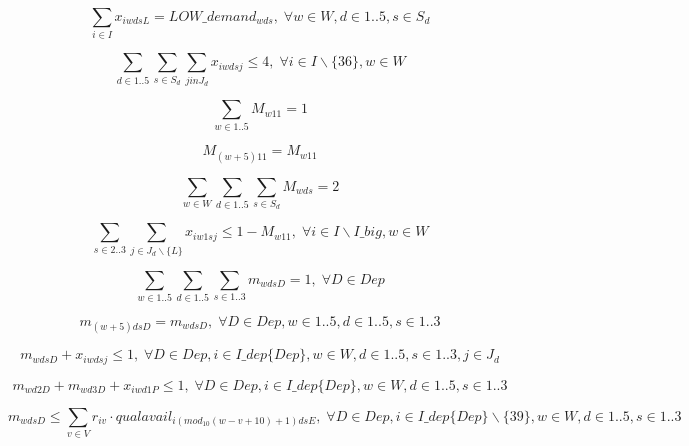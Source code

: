 \begin{equation}
\sum_{i \in I} x_{iwdsL} = LOW\_demand_{wds}, \; \forall w\in W,d\in 1..5,s\in S_d
\end{equation}

\begin{equation}
\sum_{d \in 1..5}\sum_{s \in S_d}\sum_{j in J_d} x_{iwdsj} \leq 4, \; \forall i\in I\backslash\{36\},w\in W
\end{equation}

\begin{equation}
\sum_{w \in 1..5} M_{w11} = 1
\end{equation}

\begin{equation}
M_{(w+5)11} = M_{w11}
\end{equation}

\begin{equation}
\sum_{w \in W}\sum_{d \in 1..5}\sum_{s \in S_d} M_{wds} = 2
\end{equation}

\begin{equation}
\sum_{s \in 2..3}\sum_{j \in J_d\backslash\{L\}} x_{iw1sj} \leq 1-M_{w11}, \; \forall i \in I\backslash I\_big, w \in W
\end{equation}

\begin{equation}
\sum_{w \in 1..5}\sum_{d \in 1..5}\sum_{s \in 1..3} m_{wdsD} = 1, \; \forall D \in Dep
\end{equation}

\begin{equation}
m_{(w+5)dsD} = m_{wdsD}, \; \forall D \in Dep, w \in 1..5, d \in 1..5, s \in 1..3
\end{equation}

\begin{equation}
m_{wdsD} + x_{iwdsj} \leq 1, \; \forall D \in Dep, i \in I\_dep\{Dep\}, w \in W, d \in 1..5, s \in 1..3, j \in J_d
\end{equation}

\begin{equation}
m_{wd2D} + m_{wd3D} + x_{iwd1P} \leq 1, \; \forall D \in Dep, i \in I\_dep\{Dep\}, w \in W, d \in 1..5, s \in 1..3
\end{equation}

\begin{equation}
m_{wdsD} \leq \sum_{v \in V}r_{iv}\cdot qualavail_{i(mod_{10}(w-v+10)+1)dsE}, \; \forall D \in Dep, i \in I\_dep\{Dep\} \backslash \{39\}, w \in W, d \in 1..5, s \in 1..3
\end{equation}

